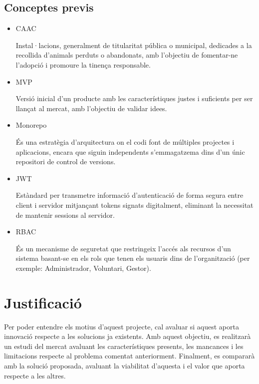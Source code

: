 \documentclass[11pt,a4paper]{report}
\begin{document}
\subsection{Conceptes previs}
\begin{itemize}
    \item CAAC \cite{covb_centres_nodate}
    
    Instal·lacions, generalment de titularitat pública o municipal, dedicades a la recollida d'animals perduts o abandonats, amb l'objectiu de fomentar-ne l'adopció i promoure la tinença responsable.
    
    \item MVP \cite{atlassian_minimum_nodate}
    
    Versió inicial d'un producte amb les característiques justes i suficients per ser llançat al mercat, amb l'objectiu de validar idees.
    
    \item Monorepo \cite{sonarsource_what_nodate}
    
    És una estratègia d'arquitectura on el codi font de múltiples projectes i aplicacions, encara que siguin independents s'emmagatzema dins d'un únic repositori de control de versions.
    
    \item JWT \cite{auth0_json_nodate}

    Estàndard per transmetre informació d'autenticació de forma segura entre client i servidor mitjançant tokens signats digitalment, eliminant la necessitat de mantenir sessions al servidor.
    \item RBAC \cite{entrust_what_nodate}
    
    És un mecanisme de seguretat que restringeix l'accés als recursos d'un sistema basant-se en els rols que tenen els usuaris dins de l'organització (per exemple: Administrador, Voluntari, Gestor).
\end{itemize}

\newpage
\section{Justificació}
Per poder entendre els motius d’aquest projecte, cal avaluar si aquest aporta innovació respecte a les solucions ja existents. Amb aquest objectiu, es realitzarà un estudi del mercat avaluant les característiques presents, les mancances i les limitacions respecte al problema comentat anteriorment. Finalment, es compararà amb la solució proposada, avaluant la viabilitat d’aquesta i el valor que aporta respecte a les altres.
\end{document}
